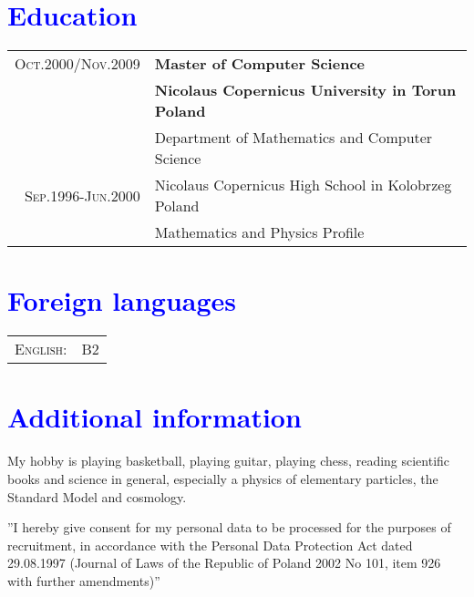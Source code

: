 \documentclass[a4paper,12pt]{article}
\begin{document}
\section{\textcolor{Blue}{Education}}
\begin{tabular}{r|p{11cm}}
	\textsc{Oct.2000/Nov.2009}
		&  \textbf{Master of Computer Science}\\
		&  \textbf{Nicolaus Copernicus University in Torun Poland}\\
		& Department of Mathematics and Computer Science\\

	\textsc{Sep.1996-Jun.2000}
		& Nicolaus Copernicus High School in Kolobrzeg Poland\\
		& Mathematics and Physics Profile\\
\end{tabular}

\section{\textcolor{Blue}{Foreign languages}}
\begin{tabular}{r|p{11cm}}
	\textsc{English:}&B2\\
\end{tabular}

\section{\textcolor{Blue}{Additional information}}
	My hobby is playing basketball, playing guitar, playing chess, reading scientific books and science in general, especially a
	physics of elementary particles, the Standard Model and cosmology.
\vfill{}

\begin{center}
{\scriptsize
	''I hereby give consent for my personal data to be processed for the purposes of recruitment,
	in accordance with the Personal Data Protection Act dated 29.08.1997
	(Journal of Laws of the Republic of Poland 2002 No 101, item 926 with further amendments)''}
\end{center}
\end{document}
